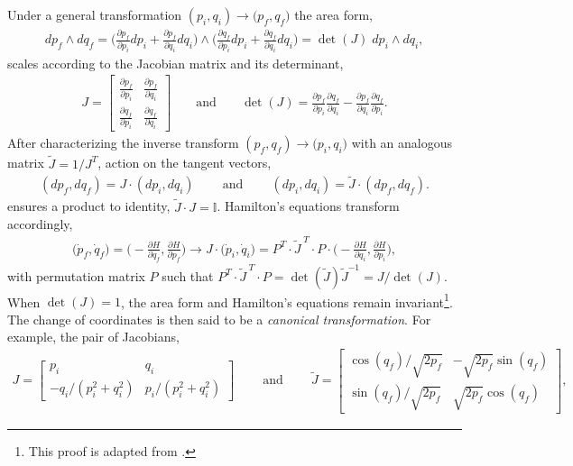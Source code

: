 \documentclass[nofootinbib,preprint]{revtex4-1}
\begin{document}
Under a general transformation $(p_i,q_i) \rightarrow \big(p_f,q_f\big)$ the area form,
\begin{eqnarray}
dp_f \wedge dq_f = \bigg(\frac{\partial p_f}{\partial  p_i}dp_i+\frac{\partial p_f}{\partial q_i}dq_i\bigg)
\wedge\bigg(\frac{\partial q_f}{\partial p_i}dp_i+\frac{\partial q_f}{\partial q_i}dq_i\bigg)
=\det(J) \; dp_i \wedge dq_i,  \nonumber
\end{eqnarray}
scales according to the Jacobian matrix and its determinant,
\begin{eqnarray}
J= \begin{bmatrix}
\frac{\partial p_f}{\partial p_i} & \frac{\partial p_f}{\partial q_i} \\
\frac{\partial q_f}{\partial p_i} & \frac{\partial q_f}{\partial q_i}
\end{bmatrix} \;\;\;\;\;\;\; \text{and} \;\;\;\;\;\;\; 
\det(J) = \frac{\partial p_f}{\partial p_i}\frac{\partial q_f}{\partial q_i}
 - \frac{\partial p_f}{\partial q_i}\frac{\partial q_f}{\partial p_i}. 
\nonumber 
\end{eqnarray}
After characterizing the inverse transform $(p_f,q_f) \rightarrow \big(p_i,q_i\big)$ 
with an analogous matrix ${\widetilde{J}=1/J^{T}}$, action on the tangent vectors,
\begin{eqnarray}
(dp_f,dq_f)= J \cdot (dp_i,dq_i) 
\;\;\;\;\;\;\;\; \text{and} \;\;\;\;\;\;\;\;
(dp_i,dq_i)= \widetilde{J} \cdot (dp_f,dq_f). \nonumber
\end{eqnarray}
ensures a product to identity, $\widetilde{J}\cdot J=\mathbb{I}$. Hamilton's equations 
transform accordingly,
\begin{eqnarray}
\big(\dot{p}_f,\dot{q}_f \big) = \bigg(-\frac{\partial H}{\partial q_f},\frac{\partial H}{\partial p_f}\bigg)   
\longrightarrow J \cdot \big(\dot{p}_i,\dot{q}_i \big) = 
P^{T}\cdot \widetilde{J}^{\;T} \cdot P \cdot \bigg(-\frac{\partial H}{\partial q_i},\frac{\partial H}{\partial p_i}\bigg),
\nonumber 
\end{eqnarray}
with permutation matrix $P$ such that $P^{T} \cdot \widetilde{J}^{\;T} \cdot P = \det(\widetilde{J})\widetilde{J}^{-1} = J/\det(J) $. 
When $\det(J)=1$, the area form and Hamilton's equations remain invariant\footnote{This 
proof is adapted from \cite{RALSTON1989}.}. The change of coordinates is 
then said to be a \textit{canonical transformation}. For example, the pair of Jacobians,
\begin{eqnarray}
J =  \begin{bmatrix} p_i & q_i \\
-q_i/(p_i^2+q_i^2) & p_i/(p_i^2+q_i^2)
\end{bmatrix}  \;\;\;\;\;\;\;\; \text{and}  \;\;\;\;\;\;\;\; 
\widetilde{J} = \begin{bmatrix} \cos(q_f)/\sqrt{2p_f} & -\sqrt{2p_f}\sin(q_f) \\
\sin(q_f)/\sqrt{2p_f} & \sqrt{2p_f}\cos(q_f) \end{bmatrix}\nonumber,
\end{eqnarray}
\end{document}
